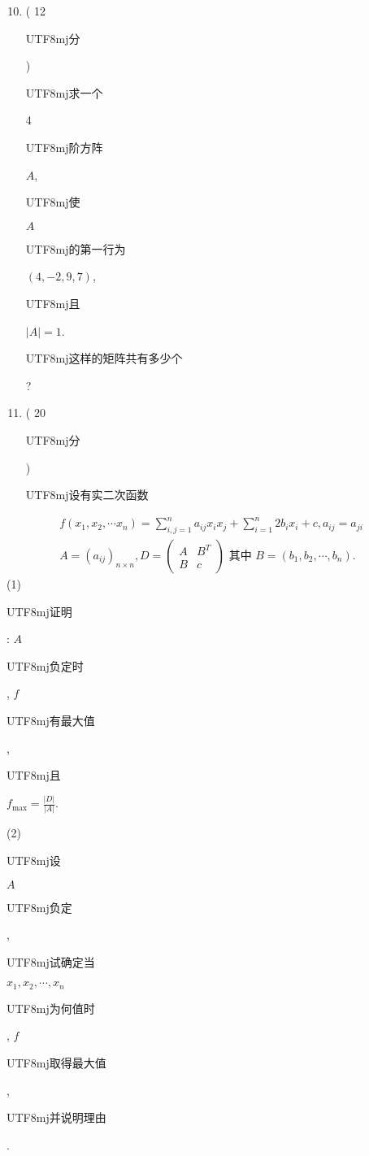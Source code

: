 \documentclass[10pt]{article}
\begin{document}
\begin{enumerate}
  \setcounter{enumi}{9}
  \item ( 12 \begin{CJK}{UTF8}{mj}分\end{CJK}) \begin{CJK}{UTF8}{mj}求一个\end{CJK} 4 \begin{CJK}{UTF8}{mj}阶方阵\end{CJK} $A$, \begin{CJK}{UTF8}{mj}使\end{CJK} $A$ \begin{CJK}{UTF8}{mj}的第一行为\end{CJK} $(4,-2,9,7)$, \begin{CJK}{UTF8}{mj}且\end{CJK} $|A|=1$. \begin{CJK}{UTF8}{mj}这样的矩阵共有多少个\end{CJK}?

  \item ( 20 \begin{CJK}{UTF8}{mj}分\end{CJK}) \begin{CJK}{UTF8}{mj}设有实二次函数\end{CJK}

\end{enumerate}
$$
\begin{gathered}
f\left(x_{1}, x_{2}, \cdots x_{n}\right)=\sum_{i, j=1}^{n} a_{i j} x_{i} x_{j}+\sum_{i=1}^{n} 2 b_{i} x_{i}+c, a_{i j}=a_{j i} \\
A=\left(a_{i j}\right)_{n \times n}, D=\left(\begin{array}{cc}
A & B^{T} \\
B & c
\end{array}\right) \text { 其中 } B=\left(b_{1}, b_{2}, \cdots, b_{n}\right) .
\end{gathered}
$$
(1) \begin{CJK}{UTF8}{mj}证明\end{CJK}: $A$ \begin{CJK}{UTF8}{mj}负定时\end{CJK}, $f$ \begin{CJK}{UTF8}{mj}有最大值\end{CJK}, \begin{CJK}{UTF8}{mj}且\end{CJK} $f_{\max }=\frac{|D|}{|A|}$.

(2) \begin{CJK}{UTF8}{mj}设\end{CJK} $A$ \begin{CJK}{UTF8}{mj}负定\end{CJK}, \begin{CJK}{UTF8}{mj}试确定当\end{CJK} $x_{1}, x_{2}, \cdots, x_{n}$ \begin{CJK}{UTF8}{mj}为何值时\end{CJK}, $f$ \begin{CJK}{UTF8}{mj}取得最大值\end{CJK}, \begin{CJK}{UTF8}{mj}并说明理由\end{CJK}.
\end{document}
